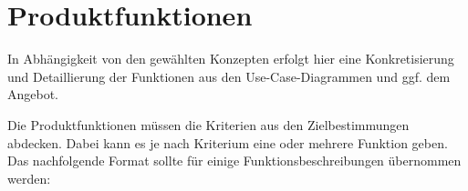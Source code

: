 

\chapter{Produktfunktionen}
\label{chap:product_functions}

In Abhängigkeit von den gewählten Konzepten erfolgt hier eine Konkretisierung
und Detaillierung der Funktionen aus den Use-Case-Diagrammen und ggf. dem
Angebot.

Die Produktfunktionen müssen die Kriterien aus den Zielbestimmungen abdecken.
Dabei kann es je nach Kriterium eine oder mehrere Funktion geben.
Das nachfolgende Format sollte für einige Funktionsbeschreibungen übernommen werden:

